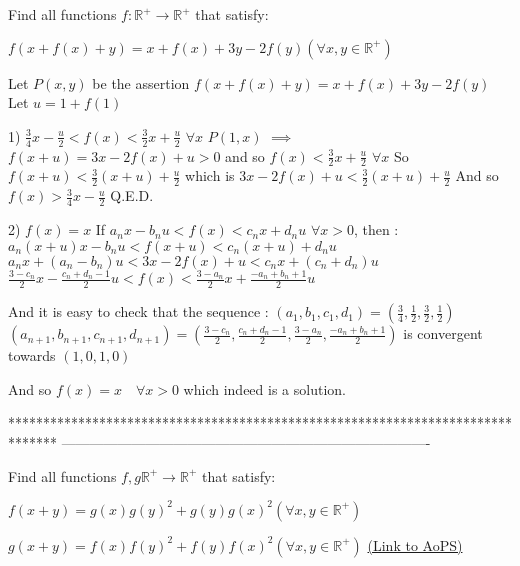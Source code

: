 \begin{solution}
	\begin{tcolorbox}Find all functions $f:\mathbb{R}^{+} \to \mathbb{R}^{+}$ that satisfy:

$f(x+f(x)+y)=x+f(x)+3y-2f(y)(\forall x,y \in \mathbb{R}^{+})$\end{tcolorbox}
Let $P(x,y)$ be the assertion $f(x+f(x)+y)=x+f(x)+3y-2f(y)$
Let $u=1+f(1)$

1) $\frac 34x-\frac u2<f(x)<\frac 32x+\frac u2$ $\forall x$
$P(1,x)$ $\implies$ $f(x+u)=3x-2f(x)+u>0$ and so $f(x)<\frac 32x+\frac u2$ $\forall x$
So $f(x+u)<\frac 32(x+u)+\frac u2$ which is $3x-2f(x)+u<\frac 32(x+u)+\frac u2$
And so $f(x)>\frac 34x-\frac u2$
Q.E.D.

2) $f(x)=x$
If $a_nx-b_nu<f(x)<c_nx+d_nu$ $\forall x>0$, then :
$a_n(x+u)x-b_nu<f(x+u)<c_n(x+u)+d_nu$
$a_nx+(a_n-b_n)u<3x-2f(x)+u<c_nx+(c_n+d_n)u$
$\frac{3-c_n}2x-\frac{c_n+d_n-1}2u<f(x)<\frac{3-a_n}2x+\frac{-a_n+b_n+1}2u$

And it is easy to check that the sequence :
$(a_1,b_1,c_1,d_1)=(\frac 34,\frac 12,\frac 32,\frac 12)$
$(a_{n+1},b_{n+1},c_{n+1},d_{n+1})=(\frac{3-c_n}2,\frac{c_n+d_n-1}2,\frac{3-a_n}2,\frac{-a_n+b_n+1}2)$
is convergent towards $(1,0,1,0)$

And so $\boxed{f(x)=x\quad\forall x>0}$ which indeed is a solution.



\end{solution}
*******************************************************************************
-------------------------------------------------------------------------------

\begin{problem}
	Find all functions $f,g \mathbb{R}^{+} \to \mathbb{R}^{+}$ that satisfy:

$f(x+y)=g(x)g(y)^2+g(y)g(x)^2 (\forall x,y \in \mathbb{R}^{+})$

$g(x+y)=f(x)f(y)^2+f(y)f(x)^2 (\forall x,y \in \mathbb{R}^{+})$
	\flushright \href{https://artofproblemsolving.com/community/c6h1611702}{(Link to AoPS)}
\end{problem}



